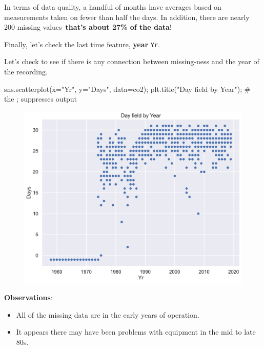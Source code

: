 \documentclass[
  letterpaper,
  DIV=11,
  numbers=noendperiod]{scrreprt}
\newenvironment{Shaded}{\begin{snugshade}}{\end{snugshade}}
\newcommand{\CommentTok}[1]{\textcolor[rgb]{0.37,0.37,0.37}{#1}}
\newcommand{\NormalTok}[1]{\textcolor[rgb]{0.00,0.23,0.31}{#1}}
\newcommand{\OperatorTok}[1]{\textcolor[rgb]{0.37,0.37,0.37}{#1}}
\newcommand{\StringTok}[1]{\textcolor[rgb]{0.13,0.47,0.30}{#1}}
\providecommand{\tightlist}{%
  \setlength{\itemsep}{0pt}\setlength{\parskip}{0pt}}\usepackage{longtable,booktabs,array}
\begin{document}
In terms of data quality, a handful of months have averages based on
measurements taken on fewer than half the days. In addition, there are
nearly 200 missing values--\textbf{that's about 27\% of the data}!

Finally, let's check the last time feature, \textbf{year} \texttt{Yr}.

Let's check to see if there is any connection between missing-ness and
the year of the recording.

\begin{Shaded}
\begin{Highlighting}[]
\NormalTok{sns.scatterplot(x}\OperatorTok{=}\StringTok{"Yr"}\NormalTok{, y}\OperatorTok{=}\StringTok{"Days"}\NormalTok{, data}\OperatorTok{=}\NormalTok{co2)}\OperatorTok{;}
\NormalTok{plt.title(}\StringTok{"Day field by Year"}\NormalTok{)}\OperatorTok{;} \CommentTok{\# the ; suppresses output}
\end{Highlighting}
\end{Shaded}

\begin{figure}[H]

{\centering \includegraphics{eda/eda_files/figure-pdf/cell-68-output-1.pdf}

}

\end{figure}

\textbf{Observations}:

\begin{itemize}
\tightlist
\item
  All of the missing data are in the early years of operation.
\item
  It appears there may have been problems with equipment in the mid to
  late 80s.
\end{itemize}
\end{document}
